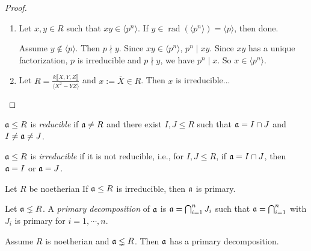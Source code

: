 \begin{proof}
    \begin{enumerate}
        \item 
            Let $x,y \in R$ such that $xy \in \langle p^{n} \rangle$. If $y \in \operatorname{rad}(\langle p^{n} \rangle) = \langle p \rangle$, then done. \par 
            Assume $y \not \in \langle p \rangle$. Then $p \nmid y$. Since $xy \in \langle p^{n} \rangle$, $p^{n} \mid xy$. Since $xy$ has a unique factorization, $p$ is irreducible and $p \nmid y$, we have $p^{n} \mid x$. So $x \in \langle p^{n} \rangle$.
        \item Let $R = \frac{k\llbracket X,Y,Z \rrbracket}{\langle X^{2}-YZ \rangle}$ and $x := \overbar{X} \in R$. Then $x$ is irreducible...
        
    \end{enumerate}
\end{proof}

\begin{definition}
    $\mathfrak{a} \leq R$ is \emph{reducible} if $\mathfrak{a} \neq R$ and there exist $I,J \leq R$ such that $\mathfrak{a} = I \cap J$ and $I \neq \mathfrak{a} \neq J$. \par 
    $\mathfrak{a} \leq R$ is \emph{irreducible} if it is not reducible, i.e., for $I,J \leq R$, if $\mathfrak{a} = I \cap J$, then $\mathfrak{a} = I$ or $\mathfrak{a} = J$.
\end{definition}

\begin{example}
\end{example}

\begin{proposition}
    Let $R$ be noetherian If $\mathfrak{a} \leq R$ is irreducible, then $\mathfrak{a}$ is primary.
\end{proposition}

\begin{definition}
    Let $\mathfrak{a} \lneq R$. A \emph{primary decomposition} of $\mathfrak{a}$ is $\mathfrak{a} = \bigcap_{i=1}^{n} J_i$ such that $\mathfrak{a} = \bigcap_{i=1}^{n}$ with $J_i$ is primary for $i = 1,\cdots,n$.
\end{definition}

\begin{theorem}[Noether]
    Assume $R$ is noetherian and $\mathfrak{a} \lneq R$. Then $\mathfrak{a}$ has a primary decomposition.
\end{theorem}





